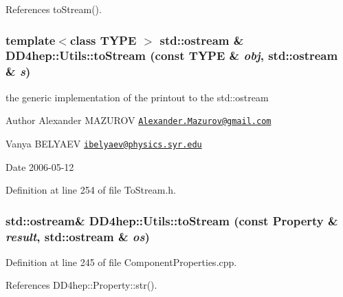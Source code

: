 References toStream().\hypertarget{namespace_d_d4hep_1_1_utils_a99350f29a14b86f5cd3022ee5d699d37}{
\subsubsection[{toStream}]{\setlength{\rightskip}{0pt plus 5cm}template$<$class TYPE $>$ std::ostream \& DD4hep::Utils::toStream (const TYPE \& {\em obj}, \/  std::ostream \& {\em s})}}
\label{namespace_d_d4hep_1_1_utils_a99350f29a14b86f5cd3022ee5d699d37}
the generic implementation of the printout to the std::ostream \begin{DoxyAuthor}{Author}
Alexander MAZUROV \href{mailto:Alexander.Mazurov@gmail.com}{\tt Alexander.Mazurov@gmail.com} 

Vanya BELYAEV \href{mailto:ibelyaev@physics.syr.edu}{\tt ibelyaev@physics.syr.edu} 
\end{DoxyAuthor}
\begin{DoxyDate}{Date}
2006-\/05-\/12 
\end{DoxyDate}


Definition at line 254 of file ToStream.h.\hypertarget{namespace_d_d4hep_1_1_utils_ab016d8d624f13c9f5470910f2057b860}{
\subsubsection[{toStream}]{\setlength{\rightskip}{0pt plus 5cm}std::ostream\& DD4hep::Utils::toStream (const {\bf Property} \& {\em result}, \/  std::ostream \& {\em os})}}
\label{namespace_d_d4hep_1_1_utils_ab016d8d624f13c9f5470910f2057b860}


Definition at line 245 of file ComponentProperties.cpp.

References DD4hep::Property::str().

